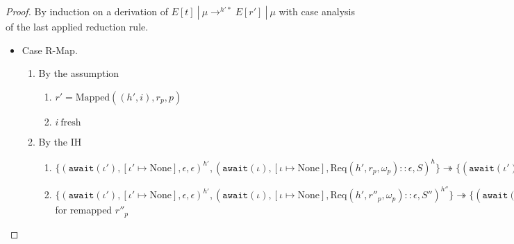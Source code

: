 \documentclass{article}
\theoremstyle{definition}
\newcommand{\Req}[3]{\text{Req}(#1, #2, #3)}
\newcommand{\Res}[2]{\text{Res}(#1, #2)}
\begin{document}
\begin{proof}
By induction on a derivation of $E[t] ~|~ \mu \rightarrow^{h'*} E[r'] ~|~ \mu$ with case analysis of the last applied reduction rule.
\begin{itemize}
\item Case R-Map.
\begin{enumerate}
\item By the assumption
  \begin{enumerate}[label=(\alph*)]
  \item $r' = \text{Mapped}((h', i), r_p, p)$
  \item $i~\text{fresh}$
  \end{enumerate}
\item By the IH
  \begin{enumerate}[label=(\alph*)]
  \item $\{ (\texttt{await}(\iota'), [\iota' \mapsto \text{None}], \epsilon, \epsilon)^{h'}, (\texttt{await}(\iota), [\iota \mapsto \text{None}], {\Req {h'} {r_p} {\omega_p}} :: \epsilon, S)^h\} \twoheadrightarrow \{ (\texttt{await}(\iota'), [\iota' \mapsto \text{None}], {\Res {\omega_p} {v_p} \emptyset} :: \epsilon, \epsilon)^{h'}, (\texttt{await}(\iota), [\iota \mapsto \text{None}], \epsilon, S_p)^{h''}\}$
  \item $\{ (\texttt{await}(\iota'), [\iota' \mapsto \text{None}], \epsilon, \epsilon)^{h'}, (\texttt{await}(\iota), [\iota \mapsto \text{None}], {\Req {h'} {r''_p} {\omega_p}} :: \epsilon, S'')^{h''}\} \twoheadrightarrow \{ (\texttt{await}(\iota'), [\iota' \mapsto \text{None}], {\Res {\omega_p} {v_p} \emptyset} :: \epsilon, \epsilon)^{h'}, (\texttt{await}(\iota), [\iota \mapsto \text{None}], \epsilon, S'''_p)^{h''}\}$ for remapped $r''_p$
  \end{enumerate}

\end{enumerate}

\end{itemize}
\end{proof}
\end{document}
